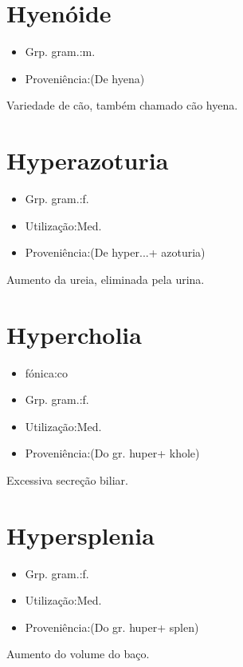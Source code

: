 \documentclass{article}
\begin{document}
\section{Hyenóide}
\begin{itemize}
\item {Grp. gram.:m.}
\end{itemize}
\begin{itemize}
\item {Proveniência:(De \textunderscore hyena\textunderscore )}
\end{itemize}
Variedade de cão, também chamado \textunderscore cão hyena\textunderscore .
\section{Hyperazoturia}
\begin{itemize}
\item {Grp. gram.:f.}
\end{itemize}
\begin{itemize}
\item {Utilização:Med.}
\end{itemize}
\begin{itemize}
\item {Proveniência:(De \textunderscore hyper...\textunderscore  + \textunderscore azoturia\textunderscore )}
\end{itemize}
Aumento da ureia, eliminada pela urina.
\section{Hypercholia}
\begin{itemize}
\item {fónica:co}
\end{itemize}
\begin{itemize}
\item {Grp. gram.:f.}
\end{itemize}
\begin{itemize}
\item {Utilização:Med.}
\end{itemize}
\begin{itemize}
\item {Proveniência:(Do gr. \textunderscore huper\textunderscore  + \textunderscore khole\textunderscore )}
\end{itemize}
Excessiva secreção biliar.
\section{Hypersplenia}
\begin{itemize}
\item {Grp. gram.:f.}
\end{itemize}
\begin{itemize}
\item {Utilização:Med.}
\end{itemize}
\begin{itemize}
\item {Proveniência:(Do gr. \textunderscore huper\textunderscore  + \textunderscore splen\textunderscore )}
\end{itemize}
Aumento do volume do baço.
\end{document}
